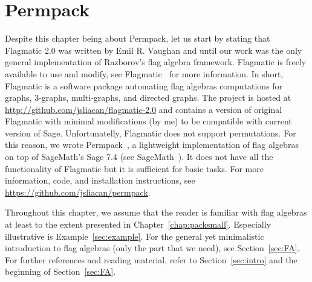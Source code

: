 \documentclass[12pt, a4paper, twoside]{report}
\begin{document}
\chapter{Permpack}
\label{chap:permpack}
% 


Despite this chapter being about Permpack, let us start by stating that Flagmatic 2.0 was written by Emil R. Vaughan and until our work was the only general implementation of Razborov's flag algebra framework. Flagmatic is freely available to use and modify, see Flagmatic~\cite{flagmatic} for more information. In short, Flagmatic is a software package automating flag algebras computations for graphs, $3$-graphs, multi-graphs, and directed graphs. The project is hosted at \url{http://github.com/jsliacan/flagmatic-2.0} and contains a version of original Flagmatic with minimal modifications (by me) to be compatible with current version of Sage. Unfortunatelly, Flagmatic does not support permutations. For this reason, we wrote Permpack~\cite{permpack}, a lightweight implementation of flag algebras on top of SageMath's Sage 7.4 (see SageMath~\cite{sagemath}). It does not have all the functionality of Flagmatic but it is sufficient for basic tasks. For more information, code, and installation instructions, see \url{https://github.com/jsliacan/permpack}. 

Throughout this chapter, we assume that the reader is familiar with flag algebras at least to the extent presented in Chapter~\ref{chap:packsmall}. Especially illustrative is Example~\ref{sec:example}. For the general yet minimalistic introduction to flag algebras (only the part that we need), see Section~\ref{sec:FA}. For further references and reading material, refer to Section~\ref{sec:intro} and the beginning of Section~\ref{sec:FA}.

\end{document}
